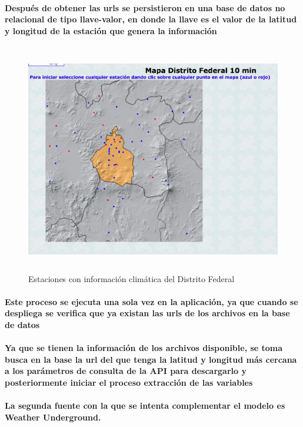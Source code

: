     \paragraph{Después de obtener las urls se persistieron en una base de datos no relacional de tipo llave-valor, en donde la llave es el valor de la latitud y longitud de la estación que genera la información}
    \begin{figure}[b!]
      \begin{center}
        \includegraphics[width=14cm,height=10cm]{./images/DF_Stations}
        \caption{Estaciones con información climática del Distrito Federal}
      \end{center}
    \end{figure}
    \paragraph{Este proceso se ejecuta una sola vez en la aplicación, ya que cuando se despliega se verifica que ya existan las urls de los archivos en la base de datos}
    \paragraph{Ya que se tienen la información de los archivos disponible, se toma busca en la base la url del que tenga la latitud y longitud más cercana a los parámetros de consulta de la API para descargarlo y posteriormente iniciar el proceso extracción de las variables} 
    \paragraph{La segunda fuente con la que se intenta complementar el modelo es Weather Underground.}
